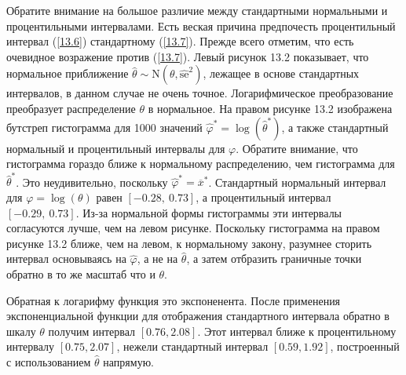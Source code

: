 Обратите внимание на большое различие между стандартными нормальными и процентильными интервалами. Есть веская причина предпочесть процентильный интервал (\ref{13.6}) стандартному (\ref{13.7}). Прежде всего отметим, что есть очевидное возражение против (\ref{13.7}). Левый рисунок 13.2 показывает, что нормальное приближение $\widehat{\theta} \sim \mathrm{N}(\theta, \widehat{\text{se}}^{2})$, лежащее в основе стандартных интервалов, в данном случае не очень точное. Логарифмическое преобразование преобразует распределение $\theta$ в нормальное. На правом рисунке 13.2 изображена бутстреп гистограмма для 1000 значений $\widehat{\varphi}^{*} = \log(\widehat{\theta}^{*})$, а также стандартный нормальный и процентильный интервалы для $\varphi$. Обратите внимание, что гистограмма гораздо ближе к нормальному распределению, чем гистограмма для $\widehat{\theta}^{*}$. Это неудивительно, поскольку  $\widehat{\varphi}^{*} = \overline{x}^{*}$. Стандартный нормальный интервал для $\varphi = \log(\theta)$ равен $[-0.28,\ 0.73]$, а процентильный интервал $[-0.29,\ 0.73]$. Из-за нормальной формы гистограммы эти интервалы согласуются лучше, чем на левом рисунке. Поскольку гистограмма на правом рисунке 13.2 ближе, чем на левом, к нормальному закону, разумнее сторить интервал основываясь на $\widehat{\varphi}$, а не на $\widehat{\theta}$, а затем отбразить граничные точки обратно в то же масштаб что и $\theta$.

\begin{figure}[H]
\end{figure}

Обратная к логарифму функция это экспоненента. После применения экспоненциальной функции для отображения стандартного интервала обратно в шкалу $\theta$ получим интервал $[0.76, 2.08]$. Этот интервал ближе к процентильному интервалу $[0.75, 2.07]$, нежели стандартный интервал $[0.59, 1.92]$, построенный с использованием $\widehat{\theta}$ напрямую.


